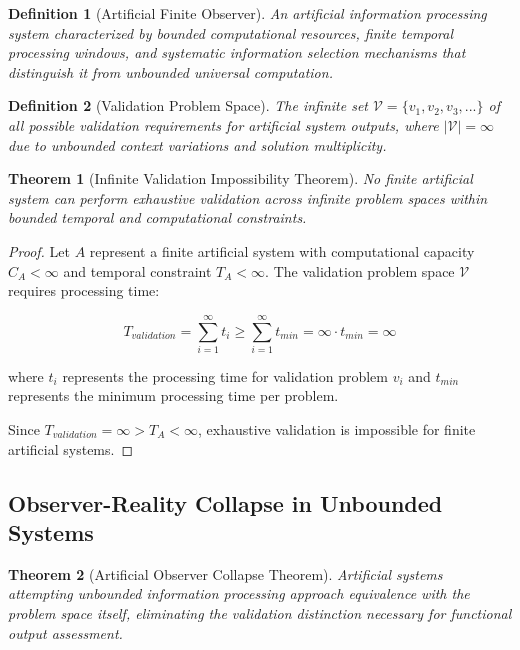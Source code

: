 \documentclass[12pt,a4paper]{article}
\newtheorem{theorem}{Theorem}
\newtheorem{definition}{Definition}
\begin{document}
\begin{definition}[Artificial Finite Observer]
An artificial information processing system characterized by bounded computational resources, finite temporal processing windows, and systematic information selection mechanisms that distinguish it from unbounded universal computation.
\end{definition}

\begin{definition}[Validation Problem Space]
The infinite set $\mathcal{V} = \{v_1, v_2, v_3, ...\}$ of all possible validation requirements for artificial system outputs, where $|\mathcal{V}| = \infty$ due to unbounded context variations and solution multiplicity.
\end{definition}

\begin{theorem}[Infinite Validation Impossibility Theorem]
No finite artificial system can perform exhaustive validation across infinite problem spaces within bounded temporal and computational constraints.
\end{theorem}

\begin{proof}
Let $A$ represent a finite artificial system with computational capacity $C_A < \infty$ and temporal constraint $T_A < \infty$. The validation problem space $\mathcal{V}$ requires processing time:

$$T_{validation} = \sum_{i=1}^{\infty} t_i \geq \sum_{i=1}^{\infty} t_{min} = \infty \cdot t_{min} = \infty$$

where $t_i$ represents the processing time for validation problem $v_i$ and $t_{min}$ represents the minimum processing time per problem.

Since $T_{validation} = \infty > T_A < \infty$, exhaustive validation is impossible for finite artificial systems.
\end{proof}

\subsection{Observer-Reality Collapse in Unbounded Systems}

\begin{theorem}[Artificial Observer Collapse Theorem]
Artificial systems attempting unbounded information processing approach equivalence with the problem space itself, eliminating the validation distinction necessary for functional output assessment.
\end{theorem}
\end{document}

